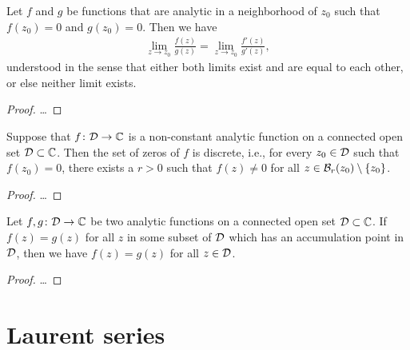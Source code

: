 \begin{theorem}
  \label{thm:l_hospital_rule}
  Let $f$ and $g$ be functions that are analytic in a neighborhood of $z_0$
  such that $f(z_0) = 0$ and $g(z_0) = 0$. Then we have
  \begin{align*}
    \lim_{z \to z_0} \frac{f(z)}{g(z)} = \lim_{z \to z_0} \frac{f'(z)}{g'(z)} ,
  \end{align*}
  understood in the sense that either both limits exist and are equal
  to each other, or else neither limit exists.
\end{theorem}
\begin{proof}
  \ldots
\end{proof}

\begin{theorem}
  \label{thm:discrete_mapping_theorem}
  Suppose that $f \colon \mathcal{D} \to \mathbb{C}$ is a non-constant
  analytic function on a connected open set $\mathcal{D} \subset \mathbb{C}$.
  Then the set of zeros of $f$ is discrete, i.e., for
  every $z_0 \in \mathcal{D}$ such that $f(z_0)=0$,
  there exists a $r>0$ such that $f(z) \ne 0$
  for all $z \in \mathcal{B}_{r}(z_0) \setminus \left\{ z_0 \right\}$.
\end{theorem}
\begin{proof}
  \ldots
\end{proof}

\begin{corollary}
  \label{cor:analytic_continuation}
  Let $f, g \colon \mathcal{D} \to \mathbb{C}$ be two analytic functions on a connected
  open set $\mathcal{D} \subset \mathbb{C}$.
  If $f(z) = g(z)$ for all $z$ in
  some subset of $\mathcal{D}$ which has an accumulation point in $\mathcal{D}$,
  then we have $f(z) = g(z)$ for all $z \in \mathcal{D}$.
\end{corollary}
\begin{proof}
  \ldots
\end{proof}



\section{Laurent series}

